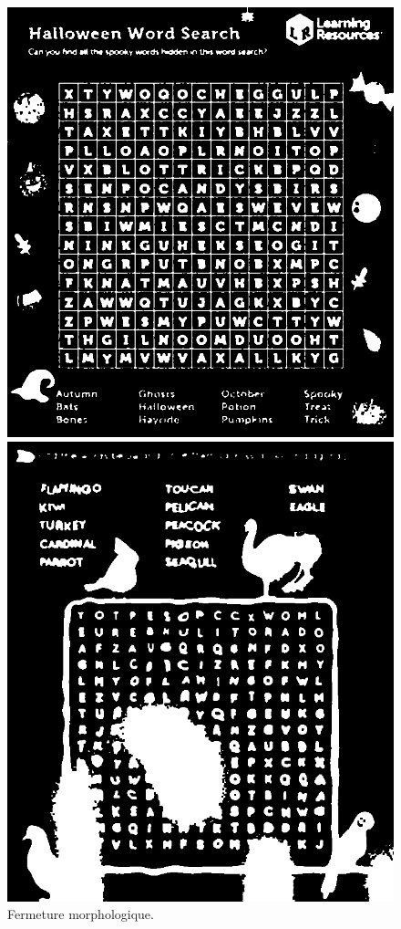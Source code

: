 \documentclass{article}
\begin{document}
\begin{figure}[H]
  \centering
      \includegraphics[width=\linewidth]{ressources/image_2_word_detection_07_morphology_closed.png}
      \caption{}
    \endminipage\quad\quad\quad\quad
    \includegraphics[width=\linewidth]{ressources/image_3_word_detection_07_morphology_closed.png}
    \caption{}
  \endminipage
  \caption{Fermeture morphologique.}
\end{figure}
\end{document}
